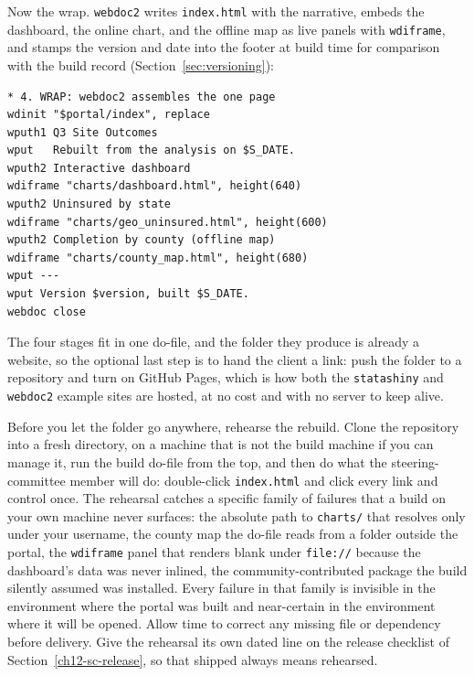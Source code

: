 Now the wrap. \texttt{webdoc2} writes \texttt{index.html} with the narrative, embeds the dashboard, the online chart, and the offline map as live panels with \texttt{wdiframe}, and stamps the version and date into the footer at build time for comparison with the build record (Section~\ref{sec:versioning}):
\par
{\footnotesize
\begin{verbatim}
* 4. WRAP: webdoc2 assembles the one page
wdinit "$portal/index", replace
wputh1 Q3 Site Outcomes
wput   Rebuilt from the analysis on $S_DATE.
wputh2 Interactive dashboard
wdiframe "charts/dashboard.html", height(640)
wputh2 Uninsured by state
wdiframe "charts/geo_uninsured.html", height(600)
wputh2 Completion by county (offline map)
wdiframe "charts/county_map.html", height(680)
wput ---
wput Version $version, built $S_DATE.
webdoc close
\end{verbatim}
}
The four stages fit in one do-file, and the folder they produce is already a website, so the optional last step is to hand the client a link: push the folder to a repository and turn on GitHub Pages, which is how both the \texttt{statashiny} and \texttt{webdoc2} example sites are hosted, at no cost and with no server to keep alive.

Before you let the folder go anywhere, rehearse the rebuild. Clone the repository into a fresh directory, on a machine that is not the build machine if you can manage it, run the build do-file from the top, and then do what the steering-committee member will do: double-click \texttt{index.html} and click every link and control once. The rehearsal catches a specific family of failures that a build on your own machine never surfaces: the absolute path to \texttt{charts/} that resolves only under your username, the county map the do-file reads from a folder outside the portal, the \texttt{wdiframe} panel that renders blank under \texttt{file://} because the dashboard's data was never inlined, the community-contributed package the build silently assumed was installed. Every failure in that family is invisible in the environment where the portal was built and near-certain in the environment where it will be opened. Allow time to correct any missing file or dependency before delivery. Give the rehearsal its own dated line on the release checklist of Section~\ref{ch12-sc-release}, so that shipped always means rehearsed.

